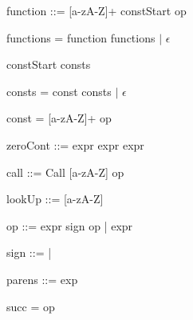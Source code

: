 function ::= [a-zA-Z]+ \bnf{=>} constStart op

functions = \bnf{,} function functions $\mid$ $\epsilon$

constStart \bnf{[} consts \bnf{]}

consts = const \bnf{,} consts $\mid$ $\epsilon$

const = [a-zA-Z]+ \bnf{=} op

zeroCont ::=  \bnf{(} expr \bnf{)} \bnf{\{} expr \bnf{\}}  \bnf{\{} expr \bnf{\}}

call ::= Call [a-zA-Z] op

lookUp ::=  [a-zA-Z] 

op ::= expr sign op | expr

sign ::= \bnf{+} | \bnf{*}  

parens ::=\bnf{(} exp \bnf{)}

succ =  op

